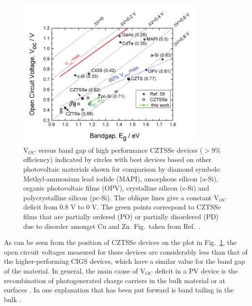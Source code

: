 \documentclass[11pt, twoside]{report}
\begin{document}
\begin{figure}[h!]
  \centering
    \includegraphics[width=0.85\textwidth]{figures/Voc.png}
    \caption[V$_{OC}$ versus band gap of high performance CZTSSe devices ($>$9\% efficiency) indicated by circles with best devices based on other photovoltaic materials shown for comparison by diamond symbols: Methyl-ammonium lead iodide (MAPI), amorphous silicon (a-Si), organic photovoltaic films (OPV), crystalline silicon (c-Si) and polycrystalline silicon (pc-Si). The oblique lines give a constant V$_{OC}$ deficit from 0.8 V to 0 V. The green points correspond to CZTSSe films that are partially ordered (PO) or partially disordered (PD) due to disorder amongst Cu and Zn.]{V$_{OC}$ versus band gap of high performance CZTSSe devices ($>$9\% efficiency) indicated by circles with best devices based on other photovoltaic materials shown for comparison by diamond symbols: Methyl-ammonium lead iodide (MAPI), amorphous silicon (a-Si), organic photovoltaic films (OPV), crystalline silicon (c-Si) and polycrystalline silicon (pc-Si). The oblique lines give a constant V$_{OC}$ deficit from 0.8 V to 0 V. The green points correspond to CZTSSe films that are partially ordered (PO) or partially disordered (PD) due to disorder amongst Cu and Zn. Fig.~taken from Ref.~.}
  \label{Voc}
\end{figure}

As can be seen from the position of CZTSSe devices on the plot in Fig.~\ref{Voc}, the open circuit voltages measured for these devices are considerably less than that of the higher-performing CIGS devices, which have a similar value for the band gap of the material.
In general, the main cause of V$_{OC}$ deficit in a PV device is the recombination of photogenerated charge carriers in the bulk material or at surfaces \cite{culprit}. In {\CZTS} one explanation that has been put forward is band tailing in the bulk \cite{band_tail}.
\end{document}
